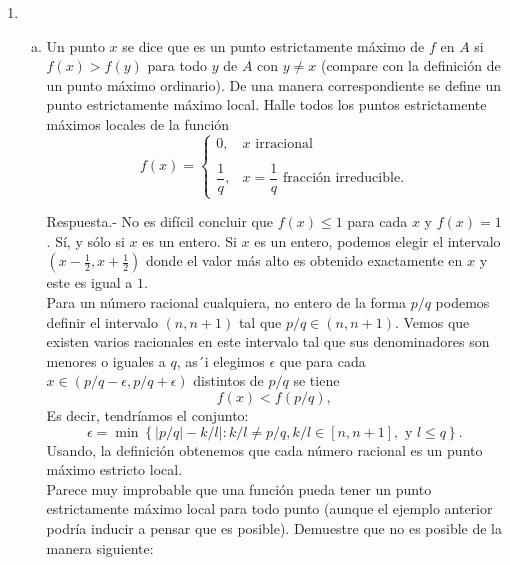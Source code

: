 \begin{enumerate}[\bfseries 1.]
\begin{enumerate}[(a)]
	\end{enumerate}

    \item 
	\begin{enumerate}[(a)]

	    \item Un punto $x$ se dice que es un punto estrictamente máximo de $f$ en $A$ si $f(x) > f(y)$ para todo $y$ de $A$ con $y\neq x$ (compare con la definición de un punto máximo ordinario). De una manera correspondiente se define un punto estrictamente máximo local. Halle todos los puntos estrictamente máximos locales de la función
	    $$
	    f(x)=
	    \left\{
		\begin{array}{ll}
		    0, & x\mbox{ irracional}\\\\
		    \dfrac{1}{q}, & x=\dfrac{1}{q}\mbox{ fracción irreducible}.
		\end{array}
	    \right.
	    $$

	    Respuesta.-\; No es difícil concluir que $f(x)\leq 1$ para cada $x$ y $f(x)=1$. Sí, y sólo si $x$ es un entero. Si $x$ es un entero, podemos elegir el intervalo $(x-\frac{1}{2},x+\frac{1}{2})$ donde el valor más alto es obtenido exactamente en $x$ y este es igual a $1$.\\
	    Para un número racional cualquiera, no entero de la forma $p/q$ podemos definir el intervalo $(n,n+1)$ tal que $p/q\in (n,n+1)$. Vemos que existen varios racionales en este intervalo tal que sus denominadores son menores o iguales a $q$, as´i elegimos $\epsilon$ que para cada $x\in \left(p/q-\epsilon,p/q+\epsilon\right)$ distintos de $p/q$ se tiene
	    $$f(x)<f(p/q),$$
	    Es decir, tendríamos el conjunto:
	    $$\epsilon=\min\left\{|p/q|-k/l|:k/l\neq p/q,k/l\in [n,n+1],\mbox{ y } l\leq q\right\}.$$
	    Usando, la definición obtenemos que cada número racional es un punto máximo estricto local.\\

	    Parece muy improbable que una función pueda tener un punto estrictamente máximo local para todo punto (aunque el ejemplo anterior podría inducir a pensar que es posible). Demuestre que no es posible de la manera siguiente:\\\\


\end{enumerate}
\end{enumerate}
